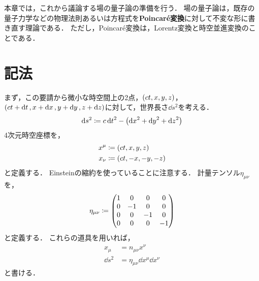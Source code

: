 \documentclass{report}
\begin{document}
  本章では，これから議論する場の量子論の準備を行う．
  場の量子論は，既存の量子力学などの物理法則あるいは方程式を\textbf{Poincar\'e変換}に対して不変な形に書き直す理論である．
  ただし，Poincar\'e変換は，Lorentz変換と時空並進変換のことである．
  \section{記法}
    まず，この要請から微小な時空間上の2点，$\qty(ct, x, y, z)$，$\qty(ct + \dd{t}, x + \dd{x}, y + \dd{y}, z + \dd{z})$に対して，世界長さ$\dd{s^2}$を考える．
    \begin{align}
      \dd{s^2} \coloneqq c\dd{t}^2 - \qty(\dd{x}^2 + \dd{y}^2 + \dd{z}^2)
    \end{align}
    4次元時空座標を，
    \begin{align}
      x^{\mu} &\coloneqq \qty(ct, x, y, z) \\ 
      x_{\nu} &\coloneqq \qty(ct, -x, -y, -z)
    \end{align}
    と定義する．
    Einsteinの縮約を使っていることに注意する．
    計量テンソル$\eta_{\mu\nu}$を，
    \begin{align}
      \eta_{\mu\nu} \coloneqq \mqty(
        1 & 0 & 0 & 0 \\ 
        0 & -1 & 0 & 0 \\ 
        0 & 0 & -1 & 0 \\ 
        0 & 0 & 0 & -1
      )
    \end{align}
    と定義する．
    これらの道具を用いれば，
    \begin{align}
      x_{\mu} &= n_{\mu\nu}x^{\nu} \\ 
      \dd{s^2} &= \eta_{\mu\nu}\dd{x^{\mu}}\dd{x^{\nu}}\label{def-of-proper-length}
    \end{align}
    と書ける．
\end{document}
